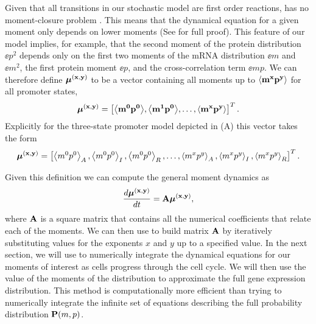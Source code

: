 Given that all transitions in our stochastic model are first order reactions,
 has no moment-closure problem \cite{Voliotis2014a}. This
means that the dynamical equation for a given moment only depends on lower
moments (See  for full proof). This feature of our model
implies, for example, that the second moment of the protein distribution
$\ee{p^2}$ depends only on the first two moments of the mRNA distribution
$\ee{m}$ and $\ee{m^2}$, the first protein moment $\ee{p}$, and the
cross-correlation term $\ee{mp}$. We can therefore define $\boldsymbol{\mu}^{\mathbf{(x, y)}}$ to be a vector
containing all moments up to $\mathbf{\left\langle m^x p^y \right\rangle}$ for all promoter states,
\begin{equation}
\boldsymbol{\mu}^{\mathbf{(x, y)}} = \left[ \mathbf{\left\langle m^0 p^0 \right\rangle},
							\mathbf{\left\langle m^1 p^0 \right\rangle},
							\ldots, \mathbf{\left\langle m^x p^y \right\rangle} \right]^T.
\end{equation}
Explicitly for the three-state promoter model depicted in
(A) this vector takes the form
\begin{equation}
	\boldsymbol{\mu}^{\mathbf{(x, y)}} = \left[ \left\langle m^0 p^0 \right\rangle_A, \left\langle m^0 p^0 \right\rangle_I, \left\langle m^0 p^0 \right\rangle_R,
	\ldots, \left\langle m^x p^y \right\rangle_A, \left\langle m^x p^y \right\rangle_I, \left\langle m^x p^y \right\rangle_R \right]^T.
\end{equation}

Given this definition we can compute the general moment dynamics as
\begin{equation}
{d{\boldsymbol{\mu}^{\mathbf{(x, y)}}} \over dt} = \mathbf{A} \boldsymbol{\mu}^{\mathbf{(x, y)}},
\label{eq_mom_dynamics}
\end{equation}
where $\mathbf{A}$ is a square matrix that contains all the numerical coefficients
that relate each of the moments. We can then use  to build
matrix $\mathbf{A}$ by iteratively substituting values for the exponents $x$ and
$y$ up to a specified value. In the next section, we will use
 to numerically integrate the dynamical equations for our
moments of interest as cells progress through the cell cycle. We will then use
the value of the moments of the distribution to approximate the full gene
expression distribution. This method is computationally more efficient than
trying to numerically integrate the infinite set of equations describing the
full probability distribution $\mathbf{P}(m, p)$.